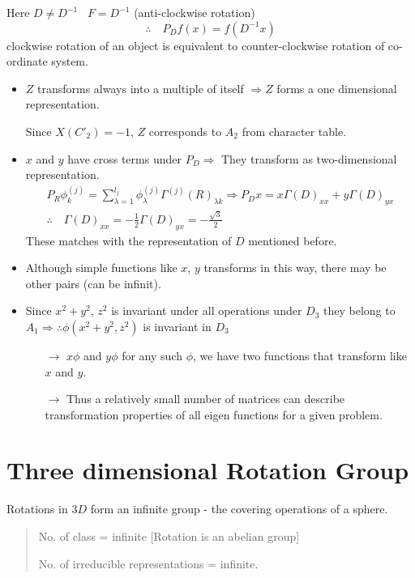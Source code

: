 Here $D\neq D^{-1}$ \ $F=D^{-1}$ (anti-clockwise rotation)
$$
\therefore\quad P_{D}f(x)=f(D^{-1}x)
$$
clockwise rotation of an object is equivalent to counter-clockwise rotation of co-ordinate system.
\begin{itemize}
\item $Z$ transforms always into a multiple of itself $\Rightarrow Z$ forms a one dimensional representation.

Since $X(C'_{2})=-1$, $Z$ corresponds to $A_{2}$ from character table.

\item $x$ and $y$ have cross terms under $P_{D}\Rightarrow$ They transform as two-dimensional representation.
\begin{gather*}
P_{R}\phi^{(j)}_{k}=\sum\limits^{l_{j}}_{\lambda=1}\phi^{(j)}_{\lambda}\Gamma^{(j)}(R)_{\lambda k}\Rightarrow P_{D}x=x\Gamma(D)_{xx}+y\Gamma(D)_{yx}\\
\therefore\quad \Gamma(D)_{xx}=-\frac{1}{2}\Gamma(D)_{yx}=-\frac{\sqrt{3}}{2}
\end{gather*}
These matches with the representation of $D$ mentioned before.

\item Although simple functions like $x$, $y$ transforms in this way, there may be other pairs (can be infinit).

\item Since $x^{2}+y^{2}$, $z^{2}$ is invariant under all operations under $D_{3}$ they belong to $A_{1}\Rightarrow \therefore \phi (x^{2}+y^{2},z^{2})$ is invariant in $D_{3}$
\begin{itemize}
\item[$\to$] $x\phi$ and $y\phi$ for any such $\phi$, we have two functions that transform like $x$ and $y$.

\item[$\to$] Thus a relatively small number of matrices can describe transformation properties of all eigen functions for a given problem.
\end{itemize}
\end{itemize}

\section*{Three dimensional Rotation Group}

Rotations in $3D$ form an infinite group - the covering operations of a sphere.
\begin{quote}
No. of class = infinite [Rotation is an abelian group]

No. of irreducible representations = infinite.
\end{quote}

